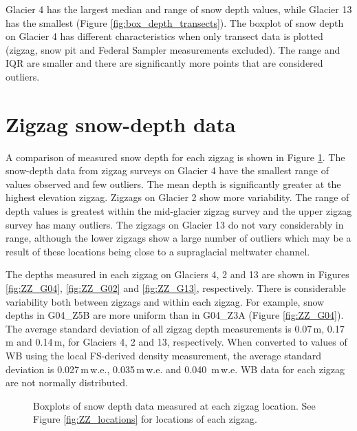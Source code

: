\documentclass{sfuthesis}
\begin{document}
{Glacier 4 has the largest median and range of snow depth values, while Glacier 13 has the smallest (Figure \ref{fig:box_depth_transects}). The boxplot of snow depth on Glacier 4 has different characteristics when only transect data is plotted (zigzag, snow pit and Federal Sampler measurements excluded). The range and IQR are smaller and there are significantly more points that are considered outliers. 

\section{Zigzag snow-depth data}

A comparison of measured snow depth for each zigzag is shown in Figure \ref{fig:ZZ_boxplot}. The snow-depth data from zigzag surveys on Glacier 4 have the smallest range of values observed and few outliers. The mean depth is significantly greater at the highest elevation zigzag. Zigzags on Glacier 2 show more variability. The range of depth values is greatest within the mid-glacier zigzag survey and the upper zigzag survey has many outliers. The zigzags on Glacier 13 do not vary considerably in range, although the lower zigzags show a large number of outliers which may be a result of these locations being close to a supraglacial meltwater channel. 

The depths measured in each zigzag on Glaciers 4, 2 and 13 are shown in Figures \ref{fig:ZZ_G04}, \ref{fig:ZZ_G02} and \ref{fig:ZZ_G13}, respectively. There is considerable variability both between zigzags and within each zigzag. For example, snow depths in G04\_Z5B are more uniform than in G04\_Z3A (Figure \ref{fig:ZZ_G04}). The average standard deviation of all zigzag depth measurements is 0.07\,m, 0.17\,m and 0.14\,m, for Glaciers 4, 2 and 13, respectively. When converted to values of WB using the local FS-derived density measurement, the average standard deviation is 0.027\,m\,w.e., 0.035\,m\,w.e. and 0.040 \,m\,w.e. WB data for each zigzag are not normally distributed.

\begin{figure}[H]
	\centering
	\caption[Boxplots of snow depth data measured at each zigzag location]{Boxplots of snow depth data measured at each zigzag location. See Figure \ref{fig:ZZ_locations} for locations of each zigzag.}
	\label{fig:ZZ_boxplot}
\end{figure}


}
\end{document}
